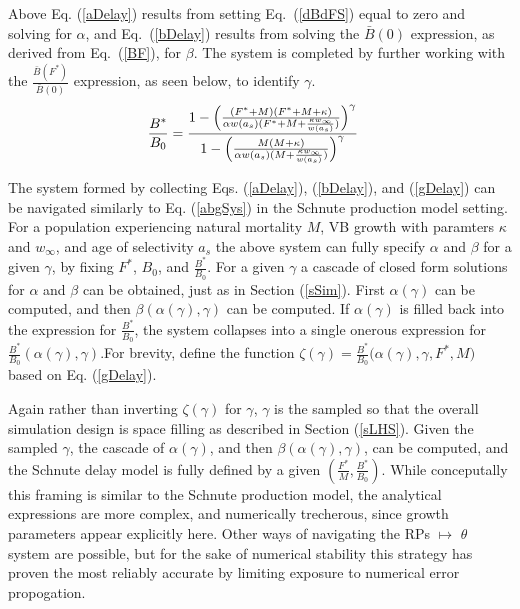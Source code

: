 %
Above Eq. (\ref{aDelay}) results from setting \mbox{Eq. (\ref{dBdFS})} equal to zero
and solving for $\alpha$, and \mbox{Eq. (\ref{bDelay})} results from solving the
$\bar{B}(0)$ expression, as derived from \mbox{Eq. (\ref{BF}),} for $\beta$. The system
is completed by further working with the $\frac{\bar{B}(F^*)}{\bar{B}(0)}$ expression,
as seen below, to identify $\gamma$.
\begin{align}
\frac{B^*}{B_0} &= \frac{ 1 - \Big(\frac{(F^* + M) (F^* + M + \kappa)}{\alpha w(a_s)(F^* + M + \frac{\kappa w_\infty}{w(a_s)})}\Big)^\gamma }{ 1 - \Big(\frac{M (M + \kappa)}{\alpha w(a_s)(M + \frac{\kappa w_\infty}{w(a_s)})}\Big)^\gamma }
\label{gDelay}
\end{align}

%
The system formed by collecting Eqs. (\ref{aDelay}), (\ref{bDelay}), and
(\ref{gDelay}) can be navigated similarly to Eq. (\ref{abgSys}) in the Schnute
production model setting. For a population experiencing natural mortality $M$,
VB growth with paramters $\kappa$ and $w_\infty$, and age of selectivity $a_s$
the above system can fully specify $\alpha$ and $\beta$ for a given $\gamma$,
by fixing $F^*$, $B_0$, and $\frac{B^*}{B_0}$. For a given $\gamma$ a cascade
of closed form solutions for $\alpha$ and $\beta$ can be obtained, just as in
Section (\ref{sSim}).
%
First $\alpha(\gamma)$ can be computed, and then $\beta(\alpha(\gamma), \gamma)$
can be computed. If $\alpha(\gamma)$ is filled back into the expression for
$\frac{B^*}{B_0}$, the system collapses into a single onerous expression for
$\frac{B^*}{B_0}(\alpha(\gamma), \gamma)$.For brevity, define the function
\mbox{$\zeta(\gamma)=\frac{B^*}{B_0}\big(\alpha(\gamma), \gamma, F^*, M\big)$}
based on Eq. (\ref{gDelay}).

%
Again rather than inverting $\zeta(\gamma)$ for $\gamma$, $\gamma$ is the
sampled so that the overall simulation design is space filling as described in
Section (\ref{sLHS}). Given the sampled $\gamma$, the cascade of $\alpha(\gamma)$, 
and then $\beta(\alpha(\gamma), \gamma)$, can be computed, and the Schnute
delay model is fully defined by a given $(\frac{F^*}{M}, \frac{B^*}{B_0})$.
%
While conceputally this framing is similar to the Schnute production model,
the analytical expressions are more complex, and numerically trecherous, since
growth parameters appear explicitly here. Other ways of navigating the RPs $\mapsto$ $\theta$
system are possible, but for the sake of numerical stability this strategy has
proven the most reliably accurate by limiting exposure to numerical error propogation.

